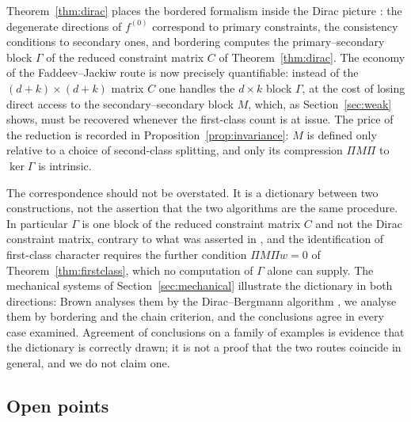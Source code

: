 \documentclass[12pt]{article}
\theoremstyle{plain}
\theoremstyle{definition}
\theoremstyle{remark}
\begin{document}
	Theorem~\ref{thm:dirac} places the bordered formalism inside the Dirac picture
	\cite{Dirac1964,HT1992,Sundermeyer1982,GT1990,RR1997}: the degenerate directions
	of $f^{(0)}$ correspond to primary constraints, the consistency conditions to
	secondary ones, and bordering computes the primary--secondary block $\Gamma$ of
	the reduced constraint matrix $C$ of Theorem~\ref{thm:dirac}. The economy of the Faddeev--Jackiw route is now precisely
	quantifiable: instead of the $(d+k)\times(d+k)$ matrix $C$ one handles the
	$d\times k$ block $\Gamma$, at the cost of losing direct access to the
	secondary--secondary block $M$, which, as Section~\ref{sec:weak} shows, must
	be recovered whenever the first-class count is at issue. The price of the
	reduction is recorded in Proposition~\ref{prop:invariance}: $M$ is defined only
	relative to a choice of second-class splitting, and only its compression
	$\Pi M\Pi$ to $\ker\Gamma$ is intrinsic.
	
	The correspondence should not be overstated. It is a dictionary between two
	constructions, not the assertion that the two algorithms are the same
	procedure. In particular $\Gamma$ is one block of the reduced constraint matrix
	$C$ and not the Dirac constraint matrix, contrary to what was asserted in
	\cite{CLMCP2026}, and the identification of first-class character requires the
	further condition $\Pi M\Pi w=0$ of Theorem~\ref{thm:firstclass}, which no
	computation of $\Gamma$ alone can supply.
	The mechanical systems of Section~\ref{sec:mechanical} illustrate the dictionary
	in both directions: Brown analyses them by the Dirac--Bergmann algorithm
	\cite{Brown2023}, we analyse them by bordering and the chain criterion, and the
	conclusions agree in every case examined. Agreement of conclusions on a family
	of examples is evidence that the dictionary is correctly drawn; it is not a
	proof that the two routes coincide in general, and we do not claim one.
	
	\subsection{Open points}
	
\end{document}
